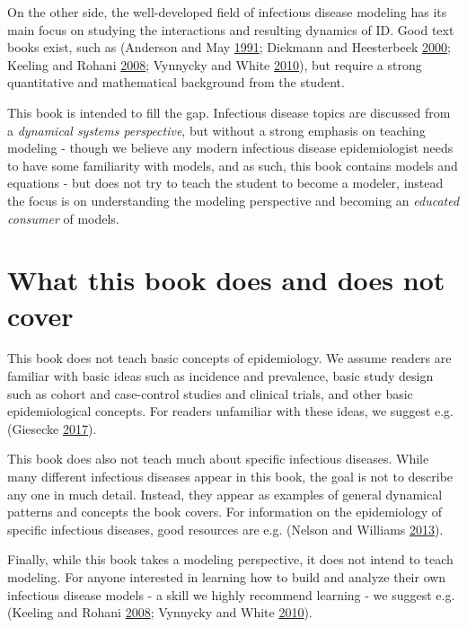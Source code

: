 \documentclass[]{book}
\theoremstyle{definition}
\theoremstyle{definition}
\theoremstyle{definition}
\theoremstyle{remark}
\begin{document}
On the other side, the well-developed field of infectious disease
modeling has its main focus on studying the interactions and resulting
dynamics of ID. Good text books exist, such as (Anderson and May
\protect\hyperlink{ref-anderson91}{1991}; Diekmann and Heesterbeek
\protect\hyperlink{ref-diekmann00}{2000}; Keeling and Rohani
\protect\hyperlink{ref-keeling08}{2008}; Vynnycky and White
\protect\hyperlink{ref-vynnycky10}{2010}), but require a strong
quantitative and mathematical background from the student.

This book is intended to fill the gap. Infectious disease topics are
discussed from a \emph{dynamical systems perspective}, but without a
strong emphasis on teaching modeling - though we believe any modern
infectious disease epidemiologist needs to have some familiarity with
models, and as such, this book contains models and equations - but does
not try to teach the student to become a modeler, instead the focus is
on understanding the modeling perspective and becoming an \emph{educated
consumer} of models.

\section{What this book does and does not
cover}\label{what-this-book-does-and-does-not-cover}

This book does not teach basic concepts of epidemiology. We assume
readers are familiar with basic ideas such as incidence and prevalence,
basic study design such as cohort and case-control studies and clinical
trials, and other basic epidemiological concepts. For readers unfamiliar
with these ideas, we suggest e.g. (Giesecke
\protect\hyperlink{ref-giesecke17}{2017}).

This book does also not teach much about specific infectious diseases.
While many different infectious diseases appear in this book, the goal
is not to describe any one in much detail. Instead, they appear as
examples of general dynamical patterns and concepts the book covers. For
information on the epidemiology of specific infectious diseases, good
resources are e.g. (Nelson and Williams
\protect\hyperlink{ref-nelson13}{2013}).

Finally, while this book takes a modeling perspective, it does not
intend to teach modeling. For anyone interested in learning how to build
and analyze their own infectious disease models - a skill we highly
recommend learning - we suggest e.g. (Keeling and Rohani
\protect\hyperlink{ref-keeling08}{2008}; Vynnycky and White
\protect\hyperlink{ref-vynnycky10}{2010}).
\end{document}
